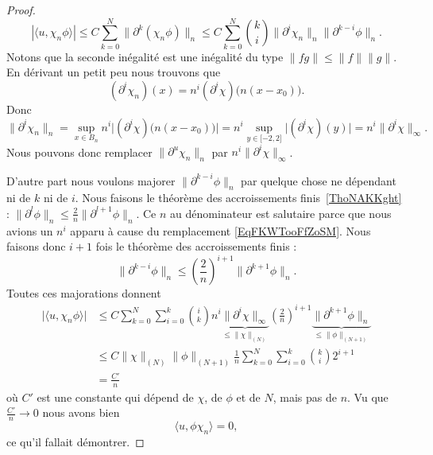 \begin{proof}
        \begin{equation}
            | \langle u, \chi_n\phi\rangle  |\leq C\sum_{k=0}^N\| \partial^k(\chi_n\phi) \|_n\leq C\sum_{k=0}^N\binom{ k }{ i }\| \partial^i\chi_n \|_n\| \partial^{k-i}\phi \|_n.
        \end{equation}
        Notons que la seconde inégalité est une inégalité du type \( \| fg \|\leq \| f \|\| g \|\). En dérivant un petit peu nous trouvons que
        \begin{equation}
            (\partial^i\chi_n)(x)=n^i(\partial^i\chi)\big( n(x-x_0) \big).
        \end{equation}
        Donc
        \begin{equation}    \label{EqFKWTooFfZoSM}
            \| \partial^i\chi_n \|_n=\sup_{x\in B_n}n^i\big| (\partial^i\chi)\big( n(x-x_0) \big) \big|=n^i\sup_{y\in\mathopen[ -2 , 2 \mathclose]}\big| (\partial^i\chi)(y) \big|=n^i\| \partial^i\chi \|_{\infty}.
        \end{equation}
        Nous pouvons donc remplacer \( \| \partial^u\chi_n \|_n\) par \( n^i\| \partial^i\chi \|_{\infty}\).

        D'autre part nous voulons majorer \( \| \partial^{k-i}\phi \|_n\) par quelque chose ne dépendant ni de \( k\) ni de \( i\). Nous faisons le théorème des accroissements finis~\ref{ThoNAKKght} : \( \| \partial^l\phi \|_n\leq \frac{ 2 }{ n }\| \partial^{l+1}\phi \|_n\). Ce \( n\) au dénominateur est salutaire parce que nous avions un \( n^i\) apparu à cause du remplacement \eqref{EqFKWTooFfZoSM}. Nous faisons donc \( i+1\) fois le théorème des accroissements finis :
        \begin{equation}
            \| \partial^{k-i} \phi\|_n\leq \left( \frac{ 2 }{ n } \right)^{i+1}\| \partial^{k+1}\phi \|_n.
        \end{equation}
        Toutes ces majorations donnent
        \begin{subequations}
            \begin{align}
            \big| \langle u, \chi_n\phi\rangle  \big|&\leq C\sum_{k=0}^N\sum_{i=0}^k\binom{ i }{ k }n^i\underbrace{\| \partial^i\chi \|_{\infty}}_{\leq \| \chi \|_{(N)}}\left( \frac{ 2 }{ n } \right)^{i+1}  \underbrace{\|  \partial^{k+1}\phi \|_n}_{\leq \| \phi \|_{(N+1)}}\\
            &\leq C\| \chi \|_{(N)}\| \phi \|_{(N+1)}\frac{1}{ n }\sum_{k=0}^N\sum_{i=0}^k\binom{ k }{ i }2^{i+1}\\
            &=\frac{ C' }{ n }
            \end{align}
        \end{subequations}
        où \( C'\) est une constante qui dépend de \( \chi\), de \( \phi\) et de \( N\), mais pas de \( n\). Vu que \( \frac{ C' }{ n }\to 0\) nous avons bien
        \begin{equation}
            \langle u, \phi\chi_n\rangle=0,
        \end{equation}
        ce qu'il fallait démontrer.
\end{proof}


